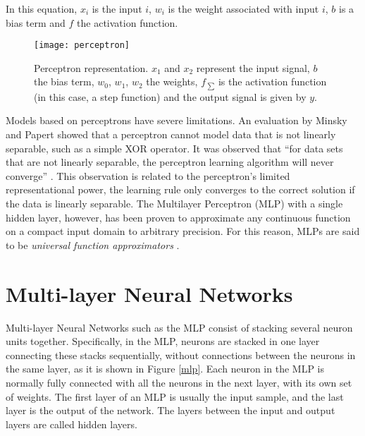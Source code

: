 In this equation, $x_{i}$ is the input $i$, $w_{i}$ is the weight associated with input $i$, $b$ is a
bias term and $f$ the activation function. 
\begin{figure}[!htb]
\centering
\texttt{[image: perceptron]}
\caption{Perceptron representation. $x_{1}$ and $x_{2}$ represent the input signal, $b$ the bias term, $w_{0}$, $w_{1}$, $w_{2}$ the weights, $f_{\:\sum}$ is the activation function (in this case, a step function) and the output signal is given by $y$.}
\label{perceptron}
\end{figure}



Models based on perceptrons have severe limitations. An evaluation by Minsky and Papert \cite{papert1969perceptrons} showed that a perceptron cannot model data that is not linearly separable, such as a simple XOR operator. It was observed that ``for data sets that are not linearly separable, the perceptron learning algorithm will never converge'' \cite{bishop2006pattern}. This observation is related to the perceptron's limited representational power, the learning rule only converges to the correct solution if the data is linearly separable. The Multilayer Perceptron (MLP) with a single hidden layer, however, has been proven \cite{hornik1989multilayer} to approximate any continuous function on a compact input domain to arbitrary precision. For this reason, MLPs are said to be \textit{universal function approximators} \cite{hornik1989multilayer}.

\section{Multi-layer Neural Networks}
Multi-layer Neural Networks such as the MLP consist of stacking several neuron units together. Specifically, in the MLP, neurons are stacked in one layer connecting these stacks sequentially, without connections between the neurons in the same layer, as it is shown in Figure \ref{mlp}. Each neuron in the MLP is normally fully connected with all the neurons in the next layer, with its own set of weights. The first layer of an MLP is usually the input sample, and the last layer is the output of the network. The layers between the input and output layers are called hidden layers.

